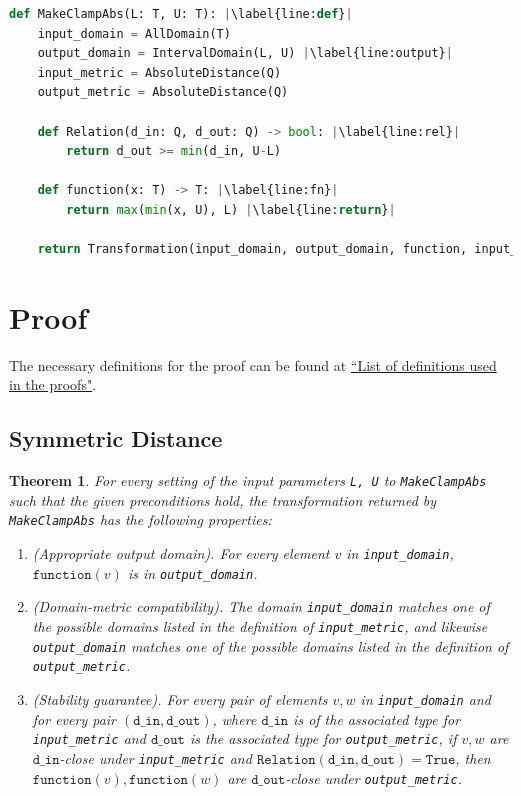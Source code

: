 \documentclass[11pt,a4paper]{article}
\newtheorem{theorem}{Theorem}
\theoremstyle{definition}
\newcommand{\din}{\texttt{d\_in}}
\newcommand{\dout}{\texttt{d\_out}}
\newcommand{\Relation}{\texttt{Relation}}
\newcommand{\True}{\texttt{True}}
\newcommand{\function}{\texttt{function}}
\begin{document}
\begin{lstlisting}[language=Python, escapechar=|] 
def MakeClampAbs(L: T, U: T): |\label{line:def}|
    input_domain = AllDomain(T)
    output_domain = IntervalDomain(L, U) |\label{line:output}|
    input_metric = AbsoluteDistance(Q)
    output_metric = AbsoluteDistance(Q)
    
    def Relation(d_in: Q, d_out: Q) -> bool: |\label{line:rel}|
        return d_out >= min(d_in, U-L)
        
    def function(x: T) -> T: |\label{line:fn}|
        return max(min(x, U), L) |\label{line:return}|
    
    return Transformation(input_domain, output_domain, function, input_metric, output_metric, stability_relation = Relation)
\end{lstlisting}

\section{Proof}
The necessary definitions for the proof can be found at \href{https://www.overleaf.com/project/60d214e390b337703d200982}{``List of definitions used in the proofs"}.

\subsection{Symmetric Distance}
\begin{theorem}
    For every setting of the input parameters \texttt{L, U} to \texttt{MakeClampAbs} such that the given preconditions
    hold, the transformation returned by \texttt{MakeClampAbs} has the following properties:
    \begin{enumerate}
        \item \textup{(Appropriate output domain).} For every element $v$ in \texttt{input\_domain}, $\function(v)$ is in \texttt{output\_domain}.
        
        \item \textup{(Domain-metric compatibility).} The domain \texttt{input\_domain} matches one of the possible domains listed in the definition of \texttt{input\_metric}, and likewise \texttt{output\_domain} matches one of the possible domains listed in the definition of \texttt{output\_metric}.
        
        \item \textup{(Stability guarantee).} For every pair of elements $v, w$ in \texttt{input\_domain} and for every pair $(\din, \dout)$,  where $\din$ is of the associated type for \texttt{input\_metric} and $\dout$ is the associated type for \texttt{output\_metric}, if $v,w$ are $\din$-close under \texttt{input\_metric} and $\Relation(\din, \dout) = \True$, then $\function(v), \function(w)$ are $\dout$-close under \texttt{output\_metric}.
    \end{enumerate}
\end{theorem}
\end{document}
